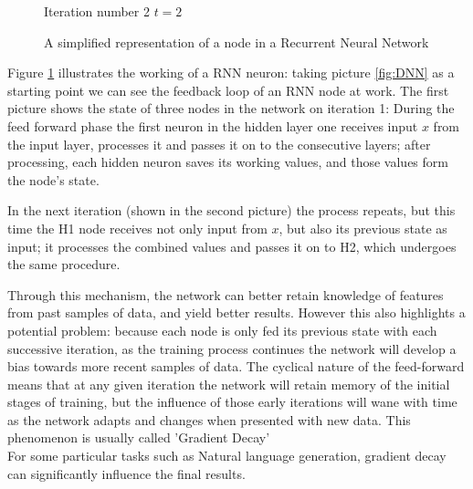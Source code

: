 \begin{figure}[H]
\centering    
{}
\begin{center}
Iteration number 2 $t=2$
\end{center}
    \caption{A simplified representation of a node in a Recurrent Neural Network}\label{fig:rnn_neuron}
    
\end{figure}
\clearpage
Figure \ref{fig:rnn_neuron} illustrates the working of a RNN neuron: taking picture \ref{fig:DNN} as a starting point we can see the feedback loop of an RNN node at work.
The first picture shows the state of three nodes in the network on iteration 1: During the feed forward phase the first neuron in the hidden layer one receives input $x$ from the input layer, processes it and passes it on to the consecutive layers; after processing, each hidden neuron saves its working values, and those values form the node's state.  

In the next iteration (shown in the second picture) the process repeats, but this time the  H1 node receives not only input from $x$, but also its previous state as input; it processes the combined values and passes it on to H2, which undergoes the same procedure.

Through this mechanism, the network can better retain knowledge of features from past samples of data, and yield better results.
However this also highlights a potential problem: because each node is only fed its previous state with each successive iteration, as the training process continues the network will develop a bias towards more recent samples of data.
 The cyclical nature of the feed-forward means that at any given iteration the network will retain memory of the initial stages of training, but the influence of those early iterations will wane with time as the network adapts and changes when presented with new data. This phenomenon is usually called 'Gradient Decay'\\
For some particular tasks such as Natural language generation, gradient decay can significantly influence the final results.

